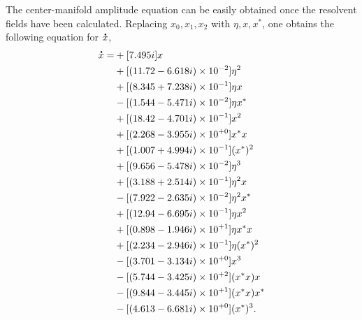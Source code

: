  The center-manifold amplitude equation can be easily obtained once the resolvent fields have been calculated.  Replacing $x_{0},x_{1},x_{2}$ with $\eta,x,x^{*}$, one obtains the following equation for $\accentset{\mbox{\large\bfseries .}}{x}$,
\begin{equation}
	\label{cavity_numerical_amplitude_eqn_x1_p1}
	\begin{aligned}
			\accentset{\mbox{\large\bfseries .}}{x} =& +[7.495i]x \\
			& + [(11.72 - 6.618i)\times10^{-2}]\eta^{2} \\
			& + [(8.345 + 7.238i)\times10^{-1}]\eta x \\ 
			& - [(1.544 - 5.471i)\times10^{-2}]\eta x^{*}  \\
			& + [(18.42 - 4.701i)\times10^{-1}] x^{2} \\
			& + [(2.268 - 3.955i)\times10^{+0}] x^{*}x \\
			& + [(1.007 + 4.994i)\times10^{-1}](x^{*})^{2} \\
			& + [(9.656 - 5.478i)\times10^{-2}]\eta^{3} \\
			& + [(3.188 + 2.514i)\times10^{-1}]\eta^{2}x \\
			& - [(7.922 - 2.635i)\times10^{-2}]\eta^{2}x^{*}  \\
			& + [(12.94 - 6.695i)\times10^{-1}]\eta x^{2}  \\
			& + [(0.898 - 1.946i)\times10^{+1}]\eta x^{*}x \\
			& + [(2.234 - 2.946i)\times10^{-1}]\eta(x^{*})^{2} \\
			& - [(3.701 - 3.134i)\times10^{+0}]x^{3} \\
			& - [(5.744 - 3.425i)\times10^{+2}](x^{*}x)x \\
			& - [(9.844 - 3.445i)\times10^{+1}](x^{*}x)x^{*} \\
			& - [(4.613 - 6.681i)\times10^{+0}](x^{*})^{3}.
		\end{aligned}
\end{equation}
